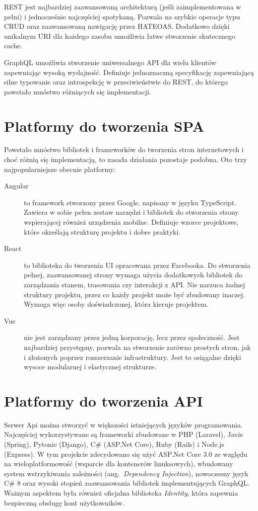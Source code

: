 		REST jest najbardziej zaawansowaną architekturą (jeśli zaimplementowana w pełni) i jednocześnie najczęściej spotykaną.
		Pozwala na szybkie operacje typu CRUD oraz zaawansowaną nawigację przez HATEOAS.
		Dodatkowo dzięki unikalnym URI dla każdego zasobu umożliwia łatwe stworzenie skutecznego cache.

		GraphQL umożliwia stworzenie uniwersalnego API dla wielu klientów zapewniając wysoką wydajność.
		Definiuje jednoznaczną specyfikację zapewniającą silne typowanie oraz introspekcję w przeciwieństwie do REST,
		do którego powstało mnóstwo różniących się implementacji.

\section{Platformy do tworzenia SPA}
	Powstało mnóstwo bibliotek i frameworków do tworzenia stron internetowych i choć różnią się implementacją, to zasada działania pozostaje podobna.
	Oto trzy najpopularniejsze obecnie platformy:
	\begin{description}
		\item[Angular] to framework stworzony przez Google, napisany w języku TypeScript.
			Zawiera w sobie pełen zestaw narzędzi i bibliotek do stworzenia strony wspierającej również urządzenia mobilne.
			Definiuje wzorce projektowe, które określają strukturę projektu i dobre praktyki.

		\item[React] to biblioteka do tworzenia UI opracowana przez Facebooka.
			Do stworzenia pełnej, zaawansowanej strony wymaga użycia dodatkowych bibliotek do zarządzania stanem, trasowania czy interakcji z API.
			Nie narzuca żadnej struktury projektu, przez co każdy projekt może być zbudowany inaczej.
			Wymaga więc osoby doświadczonej, która kieruje projektem.

		\item[Vue] nie jest zarządzany przez jedną korporację, lecz przez społeczność.
			Jest najbardziej przystępny, pozwala na stworzenie zarówno prostych stron, jak i złożonych poprzez rozszerzanie infrastruktury.
			Jest to osiągalne dzięki wysoce modularnej i elastycznej strukturze.
	\end{description}

\section{Platformy do tworzenia API}
	Serwer Api można stworzyć w większości istniejących języków programowania.
	Najczęściej wykorzystywane są frameworki zbudowane w PHP (Laravel), Javie (Spring), Pytonie (Django), C\# (ASP.Net Core), Ruby (Rails) i Node.js (Express).
	W tym projekcie zdecydowano się użyć ASP.Net Core 3.0 ze względu na wieloplatformowość (wsparcie dla kontenerów linuksowych),
	wbudowany system wstrzykiwania zależności (ang.\ \emph{Dependency Injection}), nowoczesny język C\# 8 oraz wysoki stopień zaawansowania bibliotek implementujących GraphQL.
	Ważnym aspektem była również oficjalna biblioteka \emph{Identity}, która zapewnia bezpieczną obsługę kont użytkowników.
